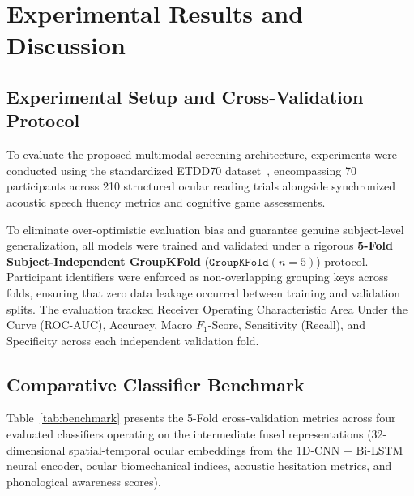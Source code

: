 
\section{Experimental Results and Discussion}

\subsection{Experimental Setup and Cross-Validation Protocol}
To evaluate the proposed multimodal screening architecture, experiments were conducted using the standardized ETDD70 dataset~\cite{etdd70_2024}, encompassing 70 participants across 210 structured ocular reading trials alongside synchronized acoustic speech fluency metrics and cognitive game assessments.

To eliminate over-optimistic evaluation bias and guarantee genuine subject-level generalization, all models were trained and validated under a rigorous \textbf{5-Fold Subject-Independent GroupKFold} ($\mathtt{GroupKFold}(n=5)$) protocol. Participant identifiers were enforced as non-overlapping grouping keys across folds, ensuring that zero data leakage occurred between training and validation splits. The evaluation tracked Receiver Operating Characteristic Area Under the Curve (ROC-AUC), Accuracy, Macro $F_1$-Score, Sensitivity (Recall), and Specificity across each independent validation fold.

\subsection{Comparative Classifier Benchmark}
Table~\ref{tab:benchmark} presents the 5-Fold cross-validation metrics across four evaluated classifiers operating on the intermediate fused representations (32-dimensional spatial-temporal ocular embeddings from the 1D-CNN + Bi-LSTM neural encoder, ocular biomechanical indices, acoustic hesitation metrics, and phonological awareness scores).

